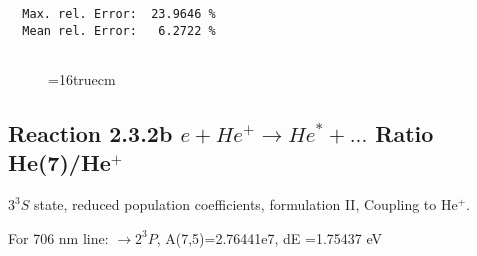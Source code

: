 \documentclass[12pt]{article}
\begin{document}
\begin{small}
\begin{verbatim}
  Max. rel. Error:  23.9646 %
  Mean rel. Error:   6.2722 %


\end{verbatim}\end{small}
\begin{figure} \label{2.3.2a}
\epsfxsize=16truecm
\end{figure}
\newpage


\subsection{
  Reaction 2.3.2b $e + He^+ \rightarrow He^* + ... $ Ratio He(7)/He$^+$
}

  $3^3S$ state,
  reduced population coefficients, formulation II,
  Coupling to He$^+$.

  For 706 nm line: $\rightarrow 2^3P$, A(7,5)=2.76441e7, dE =1.75437 eV
\end{document}
